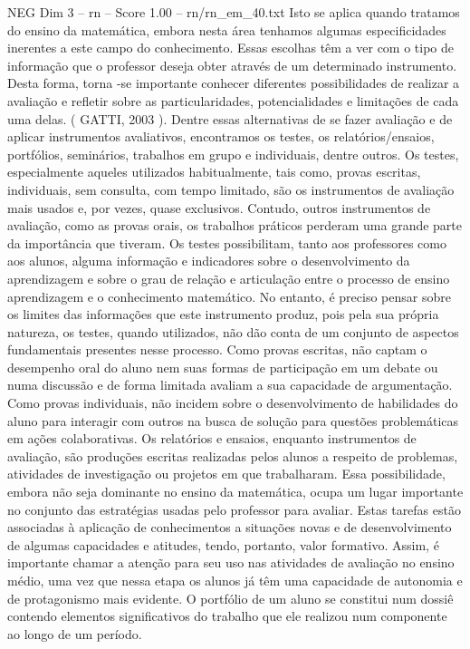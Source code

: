 \begin{textsample}{NEG Dim 3 – rn – Score 1.00 – rn/rn\_em\_40.txt}
Isto se aplica quando tratamos do ensino da matemática, embora nesta área tenhamos algumas especificidades inerentes a este campo do conhecimento.
Essas escolhas têm a ver com o tipo de informação que o professor deseja obter através de um determinado instrumento.
Desta forma, torna -se importante conhecer diferentes possibilidades de realizar a avaliação e refletir sobre as particularidades, potencialidades e limitações de cada uma delas. ( GATTI, 2003 ).
Dentre essas alternativas de se fazer avaliação e de aplicar instrumentos avaliativos, encontramos os testes, os relatórios/ensaios, portfólios, seminários, trabalhos em grupo e individuais, dentre outros.
Os testes, especialmente aqueles utilizados habitualmente, tais como, provas escritas, individuais, sem consulta, com tempo limitado, são os instrumentos de avaliação mais usados e, por vezes, quase exclusivos.
Contudo, outros instrumentos de avaliação, como as provas orais, os trabalhos práticos perderam uma grande parte da importância que tiveram.
Os testes possibilitam, tanto aos professores como aos alunos, alguma informação e indicadores sobre o desenvolvimento da aprendizagem e sobre o grau de relação e articulação entre o processo de ensino aprendizagem e o conhecimento matemático.
No entanto, é preciso pensar sobre os limites das informações que este instrumento produz, pois pela sua própria natureza, os testes, quando utilizados, não dão conta de um conjunto de aspectos fundamentais presentes nesse processo.
Como provas escritas, não captam o desempenho oral do aluno nem suas formas de participação em um debate ou numa discussão e de forma limitada avaliam a sua capacidade de argumentação.
Como provas individuais, não incidem sobre o desenvolvimento de habilidades do aluno para interagir com outros na busca de solução para questões problemáticas em ações colaborativas.
Os relatórios e ensaios, enquanto instrumentos de avaliação, são produções escritas realizadas pelos alunos a respeito de problemas, atividades de investigação ou projetos em que trabalharam.
Essa possibilidade, embora não seja dominante no ensino da matemática, ocupa um lugar importante no conjunto das estratégias usadas pelo professor para avaliar.
Estas tarefas estão associadas à aplicação de conhecimentos a situações novas e de desenvolvimento de algumas capacidades e atitudes, tendo, portanto, valor formativo.
Assim, é importante chamar a atenção para seu uso nas atividades de avaliação no ensino médio, uma vez que nessa etapa os alunos já têm uma capacidade de autonomia e de protagonismo mais evidente.
O portfólio de um aluno se constitui num dossiê contendo elementos significativos do trabalho que ele realizou num componente ao longo de um período.

\end{textsample}
